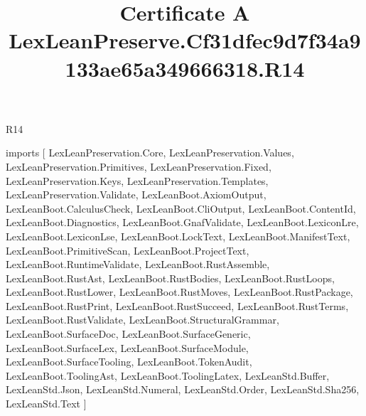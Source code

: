 \begin{lexlean}{R14}
\title{Certificate A LexLeanPreserve.Cf31dfec9d7f34a9133ae65a349666318.R14}
\begin{coremodule}
imports [
  LexLeanPreservation.Core,
  LexLeanPreservation.Values,
  LexLeanPreservation.Primitives,
  LexLeanPreservation.Fixed,
  LexLeanPreservation.Keys,
  LexLeanPreservation.Templates,
  LexLeanPreservation.Validate,
  LexLeanBoot.AxiomOutput,
  LexLeanBoot.CalculusCheck,
  LexLeanBoot.CliOutput,
  LexLeanBoot.ContentId,
  LexLeanBoot.Diagnostics,
  LexLeanBoot.GnafValidate,
  LexLeanBoot.LexiconLre,
  LexLeanBoot.LexiconLse,
  LexLeanBoot.LockText,
  LexLeanBoot.ManifestText,
  LexLeanBoot.PrimitiveScan,
  LexLeanBoot.ProjectText,
  LexLeanBoot.RuntimeValidate,
  LexLeanBoot.RustAssemble,
  LexLeanBoot.RustAst,
  LexLeanBoot.RustBodies,
  LexLeanBoot.RustLoops,
  LexLeanBoot.RustLower,
  LexLeanBoot.RustMoves,
  LexLeanBoot.RustPackage,
  LexLeanBoot.RustPrint,
  LexLeanBoot.RustSucceed,
  LexLeanBoot.RustTerms,
  LexLeanBoot.RustValidate,
  LexLeanBoot.StructuralGrammar,
  LexLeanBoot.SurfaceDoc,
  LexLeanBoot.SurfaceGeneric,
  LexLeanBoot.SurfaceLex,
  LexLeanBoot.SurfaceModule,
  LexLeanBoot.SurfaceTooling,
  LexLeanBoot.TokenAudit,
  LexLeanBoot.ToolingAst,
  LexLeanBoot.ToolingLatex,
  LexLeanStd.Buffer,
  LexLeanStd.Json,
  LexLeanStd.Numeral,
  LexLeanStd.Order,
  LexLeanStd.Sha256,
  LexLeanStd.Text
]


\end{coremodule}
\end{lexlean}
